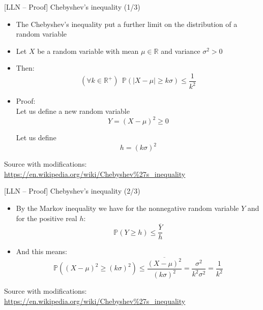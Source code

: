 \documentclass{beamer}
\begin{document}




\begin{frame}
{\centerline{[LLN -- Proof] Chebyshev's inequality (1/3)}}

\begin{itemize}
\item The Chebyshev's inequality put a further limit on the distribution of a random variable
\item Let $X$ be a random variable with mean $\mu \in \mathbb{R}$ and variance $\sigma^2 > 0$
\item Then:
$$ (\forall k \in \mathbb{R}^+) ~~  \mathbb{P} ( |X - \mu| \geq k\sigma) \leq \frac{1}{k^2} $$
\item Proof:\\
Let us define a new random variable
$$Y = (X - \mu)^2 \geq 0$$

Let us define
$$h = {(k\sigma)}^2$$


\end{itemize}


\begin{center}
\tiny 
Source with modifications: \url{https://en.wikipedia.org/wiki/Chebyshev\%27s_inequality}
\end{center}
\end{frame}


\begin{frame}
{\centerline{[LLN -- Proof] Chebyshev's inequality (2/3)}}

\begin{itemize}
\item By the Markov inequality we have for the nonnegative random variable $Y$ and for the positive real $h$:
$$\mathbb{P} ( Y  \geq h) \leq \frac{\overline{Y}}{h}$$
\item And this means:
$$\mathbb{P} ( (X - \mu)^2  \geq {(k\sigma)}^2) \leq \frac{\overline{(X - \mu)^2}}{{(k\sigma)}^2}= \frac{\sigma^2}{k^2\sigma^2}= \frac{1}{k^2}$$


\end{itemize}


\begin{center}
\tiny 
Source with modifications: \url{https://en.wikipedia.org/wiki/Chebyshev\%27s_inequality}
\end{center}
\end{frame}
\end{document}
